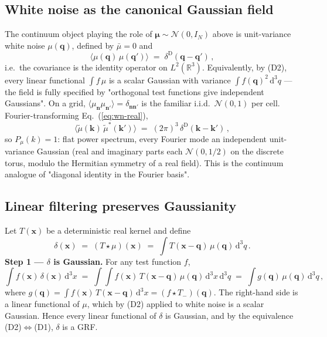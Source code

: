 \documentclass[12pt]{article}
\newcommand{\bk}{\mathbf{k}}
\newcommand{\bx}{\mathbf{x}}
\newcommand{\bq}{\mathbf{q}}
\newcommand{\bn}{\mathbf{n}}
\begin{document}
\subsection{White noise as the canonical Gaussian field}
\label{sec:grf-wn}

The continuum object playing the role of
$\boldsymbol\mu \sim \mathcal{N}(0, I_N)$ above is unit-variance
white noise $\mu(\bq)$, defined by $\bar\mu = 0$ and
\begin{equation}
  \langle \mu(\bq)\,\mu(\bq')\rangle \;=\; \delta^\mathrm{D}(\bq - \bq')\,,
  \label{eq:wn-real}
\end{equation}
i.e.\ the covariance is the identity operator on
$L^2(\mathbb{R}^3)$.  Equivalently, by (D2), every linear functional
$\int f\,\mu$ is a scalar Gaussian with variance
$\int f(\bq)^2\,\mathrm d^3q$ --- the field is fully specified by
"orthogonal test functions give independent Gaussians".  On a
grid, $\langle\mu_\bn\mu_{\bn'}\rangle = \delta_{\bn\bn'}$ is the
familiar i.i.d.\ $\mathcal{N}(0,1)$ per cell.  Fourier-transforming
Eq.~(\ref{eq:wn-real}),
\begin{equation}
  \langle \tilde\mu(\bk)\,\tilde\mu^*(\bk')\rangle \;=\;
       (2\pi)^3\,\delta^\mathrm{D}(\bk - \bk')\,,
  \label{eq:wn-fourier}
\end{equation}
so $P_\mu(k) = 1$: flat power spectrum, every Fourier mode an
independent unit-variance Gaussian (real and imaginary parts each
$\mathcal{N}(0, 1/2)$ on the discrete torus, modulo the Hermitian
symmetry of a real field).  This is the continuum analogue of
"diagonal identity in the Fourier basis".

\subsection{Linear filtering preserves Gaussianity}
\label{sec:grf-linear}

Let $T(\bx)$ be a deterministic real kernel and define
\begin{equation}
  \delta(\bx) \;=\; (T \star \mu)(\bx)
              \;=\; \int T(\bx - \bq)\,\mu(\bq)\,\mathrm d^3q\,.
  \label{eq:grf-filter}
\end{equation}
\textbf{Step 1 --- $\delta$ is Gaussian.}  For any test function
$f$,
\begin{equation*}
  \int f(\bx)\,\delta(\bx)\,\mathrm d^3x
   \;=\; \int\!\!\int f(\bx)\,T(\bx - \bq)\,\mu(\bq)\,\mathrm d^3x\,\mathrm d^3q
   \;=\; \int g(\bq)\,\mu(\bq)\,\mathrm d^3q\,,
\end{equation*}
where $g(\bq) = \int f(\bx)\,T(\bx-\bq)\,\mathrm d^3x = (f \star T_{-})(\bq)$.
The right-hand side is a linear functional of $\mu$, which by
(D2) applied to white noise is a scalar Gaussian.  Hence every
linear functional of $\delta$ is Gaussian, and by the equivalence
(D2)$\Leftrightarrow$(D1), $\delta$ is a GRF.
\end{document}
